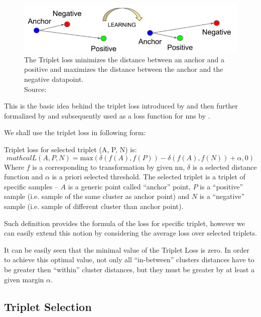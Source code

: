 \begin{figure}
    \centering
    \includegraphics[width=\textwidth]{img/triplet_loss.png}
    \caption[Triplet loss]{The Triplet loss minimizes the distance between an anchor and a positive and maximizes the distance between the anchor and the negative datapoint.\\
    Source: \cite{tripletlossnn}}
    \label{fig:triplet_loss}
\end{figure}

This is the basic idea behind the triplet loss introduced by
\cite{tripletlossfirst} and then further formalized by \cite{tripletlosssecond}
and subsequently used as a loss function for \glspl{nn} by \cite{tripletlossnn}.

We shall use the triplet loss in following form:
\begin{defn}
Triplet loss for selected triplet (A, P, N) is:
\begin{equation}
mathcal{L}(A, P, N) = \text{max}(\delta(f(A), f(P)) - \delta(f(A), f(N)) + \alpha, 0)
\label{eq:triplet}
\end{equation}
Where $f$ is a corresponding to transformation by given \gls{nn}, $\delta$
is a selected distance function and $\alpha$ is a priori selected threshold. The
selected triplet is a triplet of specific samples -- $A$ is a generic point
called ``anchor'' point, $P$ is a ``positive'' sample (i.e. sample of the same
cluster as anchor point) and $N$ is a ``negative'' sample (i.e. sample of
different cluster than anchor point).
\end{defn}

Such definition provides the formula of the loss for specific triplet, however
we can easily extend this notion by considering the average loss over selected
triplets.

It can be easily seen that the minimal value of the Triplet Loss is zero.
In order to achieve this optimal value, not only all ``in-between'' clusters
distances have to be greater then ``within'' cluster distances, but they
must be greater by at least a given margin $\alpha$.

\subsection{Triplet Selection}

